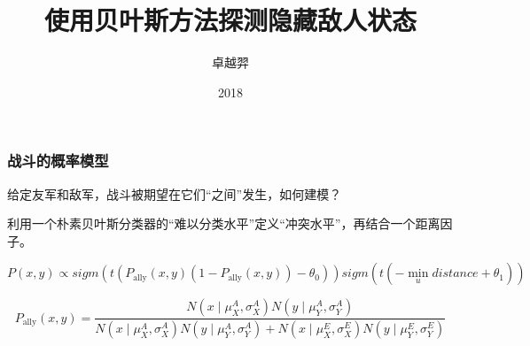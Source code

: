 \documentclass{beamer}
\title{使用贝叶斯方法探测隐藏敌人状态 }
\author{卓越羿}
\institute[SICNU]{四川师范大学数学与软件科学学院}
\date{2018}
\begin{document}
\frame{\titlepage}

\begin{frame}

\frametitle{战斗的概率模型}

给定友军和敌军，战斗被期望在它们“之间”发生，如何建模？

利用一个朴素贝叶斯分类器的“难以分类水平”定义“冲突水平”，再结合一个距离因子。

$$
P(x,y) \propto sigm(t (P_\text{ally}(x,y) (1-P_\text{ally}(x,y)) - \theta_0)) sigm(t(-\min_{u} distance + \theta_1))
$$

$$
P_\text{ally}(x,y) = \frac{
N(x\mid \mu^A_X ,\sigma^A_X) N(y \mid \mu^A_Y, \sigma^A_Y)
}{
N(x \mid \mu^A_X , \sigma^A_X) N(y \mid \mu^A_Y , \sigma^A_Y) + 
N(x \mid \mu^E_X , \sigma^E_X) N(y \mid \mu^E_Y , \sigma^E_Y)
}
$$


\end{frame}
\end{document}
